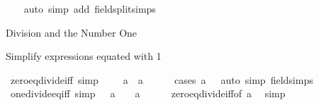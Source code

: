 \begin{isabellebody}
%
\isadelimproof
\ \ %
\endisadelimproof
%
\isatagproof
{}\isamarkupfalse%
\ {\isacharparenleft}{\kern0pt}auto\ simp\ add{\isacharcolon}{\kern0pt}\ field{\isacharunderscore}{\kern0pt}split{\isacharunderscore}{\kern0pt}simps{\isacharparenright}{\kern0pt}%
\endisatagproof
{\isafoldproof}%
%
\isadelimproof
%
\endisadelimproof
%
\begin{isamarkuptext}%
Division and the Number One%
\end{isamarkuptext}\isamarkuptrue%
%
\begin{isamarkuptext}%
Simplify expressions equated with 1%
\end{isamarkuptext}\isamarkuptrue%
\isamarkupfalse%
\ zero{\isacharunderscore}{\kern0pt}eq{\isacharunderscore}{\kern0pt}{}{\isacharunderscore}{\kern0pt}divide{\isacharunderscore}{\kern0pt}iff\ {\isacharbrackleft}{\kern0pt}simp{\isacharbrackright}{\kern0pt}{\isacharcolon}{\kern0pt}\ {\isachardoublequoteopen}{}\ {\isacharequal}{\kern0pt}\ {}\ {\isacharslash}{\kern0pt}\ a\ {\isasymlongleftrightarrow}\ a\ {\isacharequal}{\kern0pt}\ {}{\isachardoublequoteclose}\isanewline
%
\isadelimproof
\ \ %
\endisadelimproof
%
\isatagproof
{}\isamarkupfalse%
\ {\isacharparenleft}{\kern0pt}cases\ {\isachardoublequoteopen}a\ {\isacharequal}{\kern0pt}\ {}{\isachardoublequoteclose}{\isacharparenright}{\kern0pt}\ {\isacharparenleft}{\kern0pt}auto\ simp{\isacharcolon}{\kern0pt}\ field{\isacharunderscore}{\kern0pt}simps{\isacharparenright}{\kern0pt}%
\endisatagproof
{\isafoldproof}%
%
\isadelimproof
\isanewline
%
\endisadelimproof
\isanewline
{}\isamarkupfalse%
\ one{\isacharunderscore}{\kern0pt}divide{\isacharunderscore}{\kern0pt}eq{\isacharunderscore}{\kern0pt}{}{\isacharunderscore}{\kern0pt}iff\ {\isacharbrackleft}{\kern0pt}simp{\isacharbrackright}{\kern0pt}{\isacharcolon}{\kern0pt}\ {\isachardoublequoteopen}{}\ {\isacharslash}{\kern0pt}\ a\ {\isacharequal}{\kern0pt}\ {}\ {\isasymlongleftrightarrow}\ a\ {\isacharequal}{\kern0pt}\ {}{\isachardoublequoteclose}\isanewline
%
\isadelimproof
\ \ %
\endisadelimproof
%
\isatagproof
{}\isamarkupfalse%
\ zero{\isacharunderscore}{\kern0pt}eq{\isacharunderscore}{\kern0pt}{}{\isacharunderscore}{\kern0pt}divide{\isacharunderscore}{\kern0pt}iff{\isacharbrackleft}{\kern0pt}of\ a{\isacharbrackright}{\kern0pt}\ \isamarkupfalse%
\ simp%
\endisatagproof
{\isafoldproof}%
%
\isadelimproof
%
\endisadelimproof
%
\begin{isamarkuptext}%

\end{isamarkuptext}
\end{isabellebody}
